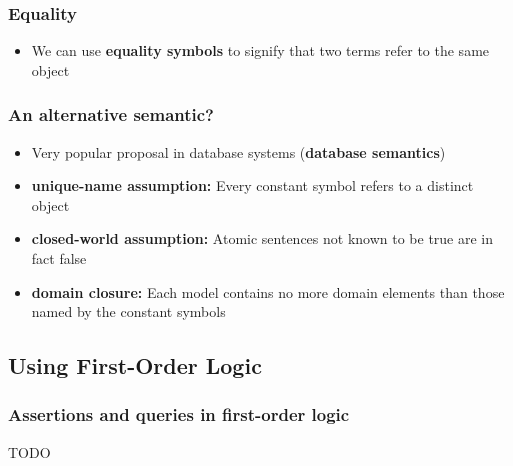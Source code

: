 \documentclass{scrartcl}
\begin{document}
\subsubsection{Equality}
\begin{itemize}
    \item
        We can use \textbf{equality symbols} to signify that two terms refer to the same object
\end{itemize}

\subsubsection{An alternative semantic?}
\begin{itemize}
    \item
        Very popular proposal in database systems (\textbf{database semantics})
    \item
        \textbf{unique-name assumption:} Every constant symbol refers to a distinct object
    \item
        \textbf{closed-world assumption:} Atomic sentences not known to be true are in fact false
    \item
        \textbf{domain closure:} Each model contains no more domain elements than those named by the constant symbols
\end{itemize}

\subsection{Using First-Order Logic}
\subsubsection{Assertions and queries in first-order logic}
    TODO
\end{document}
